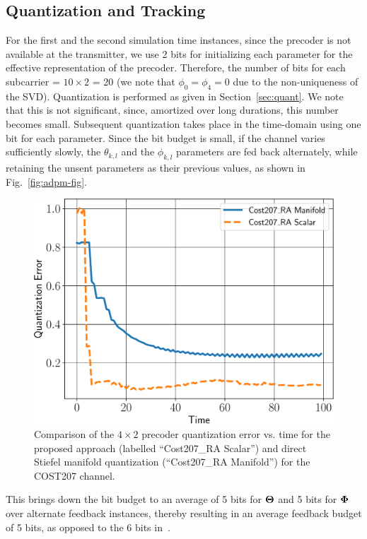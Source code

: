 \documentclass[11pt,a4paper]{report}
\def\imwidth{0.60}
\begin{document}
\subsection{Quantization and Tracking}
For the first and the second simulation time instances, since the
precoder is not available at the transmitter, we use 2 bits for
initializing each parameter for the effective representation of the
precoder. Therefore, the number of bits for each subcarrier =
$10\times 2$ = 20 (we note that $\phi_0 = \phi_4 = 0$ due to the
non-uniqueness of the SVD). Quantization is performed as given in
Section~\ref{sec:quant}. We note that this is not significant, since,
amortized over long durations, this number becomes small. Subsequent
quantization takes place in the time-domain using one bit for each
parameter. Since the bit budget is small, if the channel varies
sufficiently slowly, the $\theta_{k,l}$ and the $\phi_{k,l}$ parameters
are fed back alternately, while retaining the unsent parameters as
their previous values, as shown in
Fig.~\ref{fig:adpm-fig}.
\begin{figure}
\begin{center}
\includegraphics[width=\imwidth\columnwidth]{images/qerror.pdf}
\caption{\label{fig:error_decay}Comparison of the $4\times 2$
  precoder quantization error vs. time for the proposed
  approach (labelled ``Cost207\_RA Scalar'') and direct Stiefel
  manifold quantization (``Cost207\_RA Manifold'') for the COST207 channel.}
\end{center}
\end{figure}
This brings down the bit budget to an average of 5 bits for
$\bf{\Theta}$ and 5 bits for $\bf{\Phi}$ over alternate feedback
instances, thereby resulting in an average feedback budget of 5 bits,
as opposed to the 6 bits in~\cite{Gupt1905:Predictive}.
\end{document}
